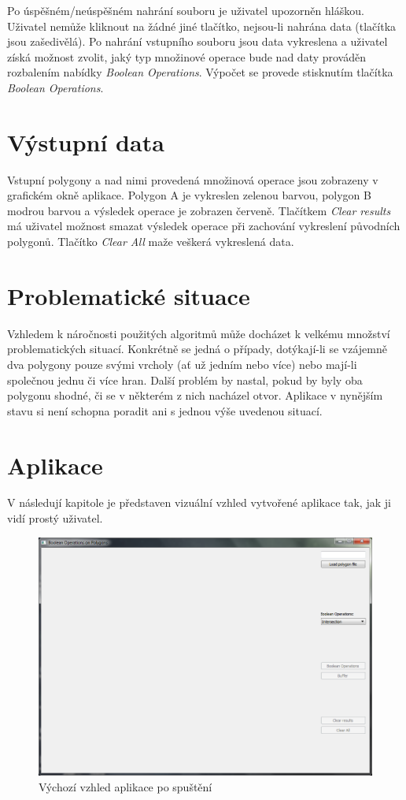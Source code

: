 \documentclass[a4paper, 12pt]{article}
\begin{document}
Po úspěšném/neúspěšném nahrání souboru je uživatel upozorněn hláškou. Uživatel nemůže kliknout na žádné jiné tlačítko, nejsou-li nahrána data (tlačítka jsou zašedivělá). Po nahrání vstupního souboru jsou data vykreslena a uživatel získá možnost zvolit, jaký typ množinové operace bude nad daty prováděn rozbalením nabídky \textsl{Boolean Operations}. Výpočet se provede stisknutím tlačítka \textsl{Boolean Operations}. 

\section{Výstupní data}
Vstupní polygony a nad nimi provedená množinová operace jsou zobrazeny v grafickém okně aplikace. Polygon A je vykreslen zelenou barvou, polygon B modrou barvou a výsledek operace je zobrazen červeně. Tlačítkem \textsl{Clear results} má uživatel možnost smazat výsledek operace při zachování vykreslení původních polygonů. Tlačítko \textsl{Clear All} maže veškerá vykreslená data.

\section{Problematické situace}
Vzhledem k náročnosti použitých algoritmů může docházet k velkému množství problematických situací. Konkrétně se jedná o případy, dotýkají-li se vzájemně dva polygony pouze svými vrcholy (ať už jedním nebo více) nebo mají-li společnou jednu či více hran. Další problém by nastal, pokud by byly oba polygonu shodné, či se v některém z nich nacházel otvor. Aplikace v nynějším stavu si není schopna poradit ani s jednou výše uvedenou situací. 

\section{Aplikace}
V následují kapitole je představen vizuální vzhled vytvořené aplikace tak, jak ji vidí prostý uživatel.\\

\begin{figure}[h!]
	\centering
	\includegraphics[width=15cm]{./pictures/app_default.png}
	\caption{Výchozí vzhled aplikace po spuštění}
\end{figure}
\end{document}
